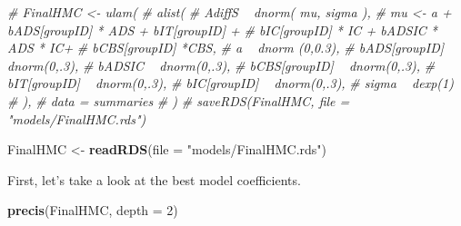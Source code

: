 \documentclass[10pt,dvipsnames,enabledeprecatedfontcommands]{scrartcl}
\newenvironment{Shaded}{\begin{snugshade}}{\end{snugshade}}
\newcommand{\KeywordTok}[1]{\textcolor[rgb]{0.13,0.29,0.53}{\textbf{#1}}}
\newcommand{\DataTypeTok}[1]{\textcolor[rgb]{0.13,0.29,0.53}{#1}}
\newcommand{\DecValTok}[1]{\textcolor[rgb]{0.00,0.00,0.81}{#1}}
\newcommand{\StringTok}[1]{\textcolor[rgb]{0.31,0.60,0.02}{#1}}
\newcommand{\CommentTok}[1]{\textcolor[rgb]{0.56,0.35,0.01}{\textit{#1}}}
\newcommand{\NormalTok}[1]{#1}
\begin{document}
\begin{Shaded}
\begin{Highlighting}[]
\CommentTok{# FinalHMC <- ulam(}
\CommentTok{#   alist(}
\CommentTok{#     AdiffS ~ dnorm( mu, sigma ),}
\CommentTok{#     mu <- a + bADS[groupID] * ADS +  bIT[groupID] +}
\CommentTok{#     bIC[groupID] * IC + bADSIC * ADS * IC+}
\CommentTok{#     bCBS[groupID] *CBS,}
\CommentTok{#     a ~ dnorm (0,0.3),}
\CommentTok{#     bADS[groupID] ~ dnorm(0,.3),}
\CommentTok{#     bADSIC ~ dnorm(0,.3),}
\CommentTok{#     bCBS[groupID] ~ dnorm(0,.3),}
\CommentTok{#     bIT[groupID] ~ dnorm(0,.3),}
\CommentTok{#     bIC[groupID] ~ dnorm(0,.3),}
\CommentTok{#     sigma  ~ dexp(1)}
\CommentTok{#   ),}
\CommentTok{#   data = summaries}
\CommentTok{# )}
\CommentTok{# saveRDS(FinalHMC, file = "models/FinalHMC.rds")}

\NormalTok{FinalHMC <-}\StringTok{ }\KeywordTok{readRDS}\NormalTok{(}\DataTypeTok{file =} \StringTok{"models/FinalHMC.rds"}\NormalTok{)}
\end{Highlighting}
\end{Shaded}

\normalsize
First, let's take a look at the best model coefficients.

\vspace{1mm} \footnotesize

\begin{Shaded}
\begin{Highlighting}[]
\KeywordTok{precis}\NormalTok{(FinalHMC, }\DataTypeTok{depth =} \DecValTok{2}\NormalTok{)}
\end{Highlighting}
\end{Shaded}
\end{document}
